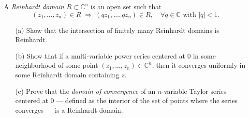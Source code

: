 \documentclass[12pt]{article}  %
\begin{document}
\begin{problem}{5}
A \emph{Reinhardt domain} $R \subset \mathbb{C}^n$ is an open set such that
\[
    (z_1,\dots,z_n)\in R \;\Rightarrow\; (qz_1,\dots,qz_n)\in R,\quad \forall q\in\mathbb{C} \text{ with } |q|<1.
\]

\begin{enumerate}
    \item[(a)] Show that the intersection of finitely many Reinhardt domains is Reinhardt.
    \item[(b)] Show that if a multi-variable power series centered at $0$ in some neighborhood of some point $(z_1,\dots,z_n)\in \mathbb{C}^n$, then it converges uniformly in some Reinhardt domain containing $z$.
    \item[(c)] Prove that the \emph{domain of convergence} of an $n$-variable Taylor series centered at $0$ --- defined as the interior of the set of points where the series converges --- is a Reinhardt domain.
\end{enumerate}
\end{problem}
\end{document}
